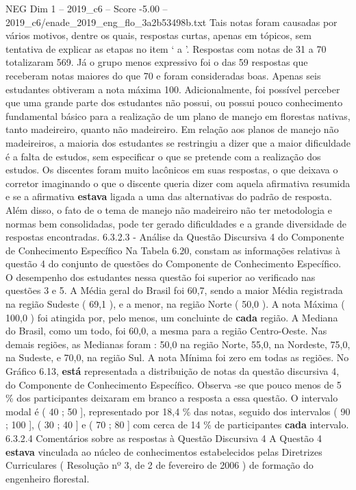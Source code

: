 \begin{textsample}{NEG Dim 1 – 2019\_c6 – Score -5.00 – 2019\_c6/enade\_2019\_eng\_flo\_3a2b53498b.txt}
Tais notas foram causadas por vários motivos, dentre os quais, respostas curtas, apenas em tópicos, sem tentativa de explicar as etapas no item ‘ a ’.
Respostas com notas de 31 a 70 totalizaram 569.
Já o grupo menos expressivo foi o das 59 respostas que receberam notas maiores do que 70 e foram consideradas boas.
Apenas seis estudantes obtiveram a nota máxima 100.
Adicionalmente, foi possível perceber que uma grande parte dos estudantes não possui, ou possui pouco conhecimento fundamental básico para a realização de um plano de manejo em florestas nativas, tanto madeireiro, quanto não madeireiro.
Em relação aos planos de manejo não madeireiros, a maioria dos estudantes se restringiu a dizer que a maior dificuldade é a falta de estudos, sem especificar o que se pretende com a realização dos estudos.
Os discentes foram muito lacônicos em suas respostas, o que deixava o corretor imaginando o que o discente queria dizer com aquela afirmativa resumida e se a afirmativa \textbf{estava} ligada a uma das alternativas do padrão de resposta.
Além disso, o fato de o tema de manejo não madeireiro não ter metodologia e normas bem consolidadas, pode ter gerado dificuldades e a grande diversidade de respostas encontradas. 6.3.2.3 - Análise da Questão Discursiva 4 do Componente de Conhecimento Específico Na Tabela 6.20, constam as informações relativas à questão 4 do conjunto de questões do Componente de Conhecimento Específico.
O desempenho dos estudantes nessa questão foi superior ao verificado nas questões 3 e 5.
A Média geral do Brasil foi 60,7, sendo a maior Média registrada na região Sudeste ( 69,1 ), e a menor, na região Norte ( 50,0 ).
A nota Máxima ( 100,0 ) foi atingida por, pelo menos, um concluinte de \textbf{cada} região.
A Mediana do Brasil, como um todo, foi 60,0, a mesma para a região Centro-Oeste.
Nas demais regiões, as Medianas foram : 50,0 na região Norte, 55,0, na Nordeste, 75,0, na Sudeste, e 70,0, na região Sul.
A nota Mínima foi zero em todas as regiões.
No Gráfico 6.13, \textbf{está} representada a distribuição de notas da questão discursiva 4, do Componente de Conhecimento Específico.
Observa -se que pouco menos de 5 \% dos participantes deixaram em branco a resposta a essa questão.
O intervalo modal é ( 40 ; 50 ], representado por 18,4 \% das notas, seguido dos intervalos ( 90 ; 100 ], ( 30 ; 40 ] e ( 70 ; 80 ] com cerca de 14 \% de participantes \textbf{cada} intervalo. 6.3.2.4 Comentários sobre as respostas à Questão Discursiva 4 A Questão 4 \textbf{estava} vinculada ao núcleo de conhecimentos estabelecidos pelas Diretrizes Curriculares ( Resolução nº 3, de 2 de fevereiro de 2006 ) de formação do engenheiro florestal.

\end{textsample}
